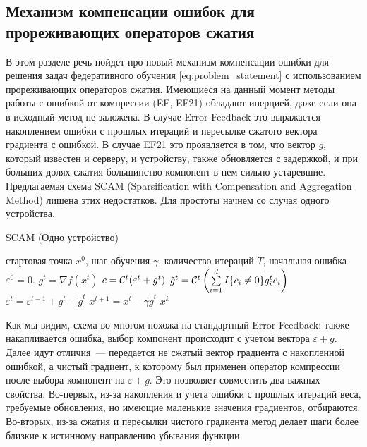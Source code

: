 \subsection{Механизм компенсации ошибок для прореживающих операторов сжатия}
    В этом разделе речь пойдет про новый механизм компенсации ошибки для решения задач федеративного обучения \eqref{eq:problem_statement} с использованием прореживающих операторов сжатия. Имеющиеся на данный момент методы работы с ошибкой от компрессии (EF, EF21) обладают инерцией, даже если она в исходный метод не заложена. В случае Error Feedback это выражается накоплением ошибки с прошлых итераций и пересылке сжатого вектора градиента с ошибкой. В случае EF21 это проявляется в том, что вектор $g$, который известен и серверу, и устройству, также обновляется с задержкой, и при больших долях сжатия большинство компонент в нем сильно устаревшие. Предлагаемая схема SCAM (Sparsification with Compensation and Aggregation Method) лишена этих недостатков. Для простоты начнем со случая одного устройства.

    \begin{algorithm}[H]
        \caption{SCAM (Одно устройство)}
        \label{alg:scam_single}
        \begin{algorithmic}
             стартовая точка $x^0$, шаг обучения $\gamma$, количество итераций $T$, начальная ошибка $\varepsilon^0 = 0$.
                \STATE $g^t = \nabla f(x^t)$
                \STATE $c = {\cal C}^t (\varepsilon^t + g^t)$
                \STATE $\tilde{g}^t = {\cal C}^t \left(\sum\limits_{i=1}^{d} I\{c_i \neq 0\} g^t_i e_i\right)$
                \STATE $\varepsilon^t = \varepsilon^{t-1} + g^t - \tilde{g}^t$
                \STATE $x^{t+1} = x^t - \gamma \tilde{g}^t$
            \ENDFOR
             $x^k$
        \end{algorithmic}
    \end{algorithm}

    Как мы видим, схема во многом похожа на стандартный Error Feedback: также накапливается ошибка, выбор компонент происходит с учетом вектора $\varepsilon + g$. Далее идут отличия~--- передается не сжатый вектор градиента с накопленной ошибкой, а чистый градиент, к которому был применен оператор компрессии после выбора компонент на $\varepsilon + g$. Это позволяет совместить два важных свойства. Во-первых, из-за накопления и учета ошибки с прошлых итераций веса, требуемые обновления, но имеющие маленькие значения градиентов, отбираются. Во-вторых, из-за сжатия и пересылки чистого градиента метод делает шаги более близкие к истинному направлению убывания функции.

